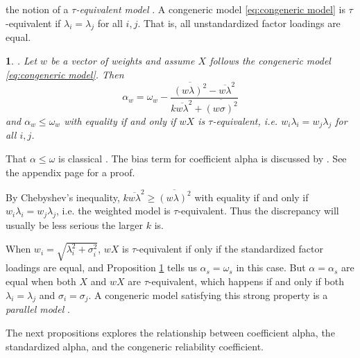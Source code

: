 \documentclass{article}
\makeatletter
\theoremstyle{plain}
\theoremstyle{plain}
\theoremstyle{definition}
\theoremstyle{remark}
\theoremstyle{definition}
\theoremstyle{plain}
\theoremstyle{plain}
\newtheorem{prop}[thm]{\protect\propositionname}
\theoremstyle{definition}
\newenvironment{proof}[1][\protect\proofname]{\par
	\normalfont\topsep6\p@\@plus6\p@\relax
	\trivlist
	\itemindent\parindent
	\item[\hskip\labelsep\scshape #1]\ignorespaces
}{%
	\endtrivlist\@endpefalse
}
\providecommand{\proofname}{Proof}
\providecommand{\propositionname}{Proposition}
\makeatother
\begin{document}
the notion of a \emph{$\tau$-equivalent model} \citep[][section 2.13]{Lord1968-ax}. A congeneric model \eqref{eq:congeneric model} is $\tau$-equivalent if $\lambda_{i}=\lambda_{j}$ for all $i,j$. That is, all unstandardized
factor loadings are equal.
\begin{prop}
\label{prop:weighted alpha}. Let $w$ be a vector of weights and
assume $X$ follows the congeneric model \eqref{eq:congeneric model}. Then 
\[
\alpha_{w}=\omega_w-\frac{\overline{(w\lambda)^{2}}-\overline{w\lambda}^{2}}{k\overline{w\lambda}^{2}+\overline{(w\sigma)^{2}}}
\]
and $\alpha_w \leq \omega_w$ with equality if and only if $wX$ is $\tau$-equivalent, i.e. $w_i\lambda_{i}=w_j\lambda_{j}$
for all $i,j$.
\end{prop}
\begin{proof}
That  $\alpha \leq \omega$ is classical \citep[][pp. 87 -- 89]{Lord1968-ax}. The bias term for coefficient alpha is discussed by \citet{Raykov1997-bu}. See the appendix page \pageref{proof:weighted alpha}
for a proof.
\end{proof}

By Chebyshev's inequality, $k\overline{w\lambda}^{2}\geq\overline{(w\lambda)^{2}}$
with equality if and only if $w_{i}\lambda_{i}=w_{j}\lambda_{j}$,
i.e. the weighted model is $\tau$-equivalent. Thus the discrepancy
will usually be less serious the larger $k$ is.

When $w_{i}=\sqrt{\lambda_{i}^{2}+\sigma_{i}^{2}}$, $wX$ is $\tau$-equivalent if only if the standardized factor loadings are equal, and Proposition \ref{prop:weighted alpha} tells us $\alpha_s = \omega_s$ in this case. But $\alpha =\alpha_s$ are equal when both $X$ and $wX$ are $\tau$-equivalent, which happens if and only if both $\lambda_{i}=\lambda_{j}$
and $\sigma_{i}=\sigma_{j}$. A congeneric model satisfying this strong property is a \emph{parallel model} \citep[][section 2.13]{Lord1968-ax}. 

The next propositions explores the relationship between coefficient alpha, the standardized alpha, and the congeneric reliability coefficient.
\end{document}
